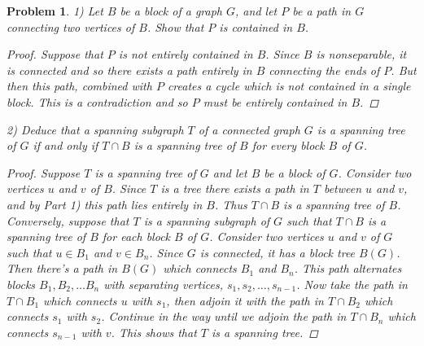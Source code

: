\documentclass{article}
\newtheorem{problem}{Problem}
\begin{document}
\begin{flushleft}
\begin{problem}
1) Let $B$ be a block of a graph $G$, and let $P$ be a path in $G$ connecting two vertices of $B$. Show that $P$ is contained in $B$.
\begin{proof}
Suppose that $P$ is not entirely contained in $B$. Since $B$ is nonseparable, it is connected and so there exists a path entirely in $B$ connecting the ends of $P$. But then this path, combined with $P$ creates a cycle which is not contained in a single block. This is a contradiction and so $P$ must be entirely contained in $B$.
\end{proof}
2) Deduce that a spanning subgraph $T$ of a connected graph $G$ is a spanning tree of $G$ if and only if $T \cap B$ is a spanning tree of $B$ for every block $B$ of $G$.
\begin{proof}
Suppose $T$ is a spanning tree of $G$ and let $B$ be a block of $G$. Consider two vertices $u$ and $v$ of $B$. Since $T$ is a tree there exists a path in $T$ between $u$ and $v$, and by Part 1) this path lies entirely in $B$. Thus $T \cap B$ is a spanning tree of $B$. Conversely, suppose that $T$ is a spanning subgraph of $G$ such that $T \cap B$ is a spanning tree of $B$ for each block $B$ of $G$. Consider two vertices $u$ and $v$ of $G$ such that $u \in B_1$ and $v \in B_n$. Since $G$ is connected, it has a block tree $B(G)$. Then there's a path in $B(G)$ which connects $B_1$ and $B_n$. This path alternates blocks $B_1, B_2, \dots B_n$ with separating vertices, $s_1, s_2, \dots , s_{n-1}$. Now take the path in $T \cap B_1$ which connects $u$ with $s_1$, then adjoin it with the path in $T \cap B_2$ which connects $s_1$ with $s_2$. Continue in the way until we adjoin the path in $T \cap B_n$ which connects $s_{n-1}$ with $v$. This shows that $T$ is a spanning tree.
\end{proof}
\end{problem}


\end{flushleft}
\end{document}
